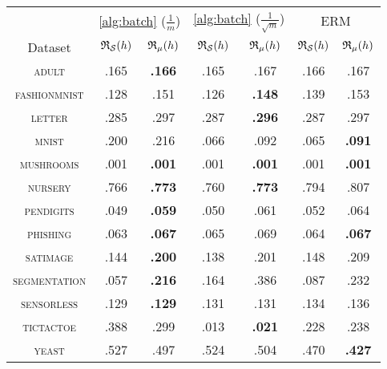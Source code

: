 \begin{tabular}{c@{\ }|@{\ }c@{\ }c@{\ }|@{\ }c@{\ }c@{\ }|@{\ }c@{\ }c@{\ }||}
\toprule
 & \multicolumn{2}{c}{\cref{alg:batch} {\small ($\frac{1}{m}$)}} & \multicolumn{2}{c}{\cref{alg:batch} {\small ($\frac{1}{\sqrt{m}}$)}} & \multicolumn{2}{c}{ERM} \\
Dataset & {\scriptsize $\mathfrak{R}_{\mathcal{S}}(h)$} & {\scriptsize $\mathfrak{R}_{\mu}(h)$} & {\scriptsize $\mathfrak{R}_{\mathcal{S}}(h)$} & {\scriptsize $\mathfrak{R}_{\mu}(h)$} & {\scriptsize $\mathfrak{R}_{\mathcal{S}}(h)$} & {\scriptsize $\mathfrak{R}_{\mu}(h)$} \\
\midrule
\textsc{\footnotesize adult} & .165 & {\bf .166} & .165 & .167 & .166 & .167 \\
\textsc{\footnotesize fashionmnist} & .128 & .151 & .126 & {\bf .148} & .139 & .153 \\
\textsc{\footnotesize letter} & .285 & .297 & .287 & {\bf .296} & .287 & .297 \\
\textsc{\footnotesize mnist} & .200 & .216 & .066 & .092 & .065 & {\bf .091} \\
\textsc{\footnotesize mushrooms} & .001 & {\bf .001} & .001 & {\bf .001} & .001 & {\bf .001} \\
\textsc{\footnotesize nursery} & .766 & {\bf .773} & .760 & {\bf .773} & .794 & .807 \\
\textsc{\footnotesize pendigits} & .049 & {\bf .059} & .050 & .061 & .052 & .064 \\
\textsc{\footnotesize phishing} & .063 & {\bf .067} & .065 & .069 & .064 & {\bf .067} \\
\textsc{\footnotesize satimage} & .144 & {\bf .200} & .138 & .201 & .148 & .209 \\
\textsc{\footnotesize segmentation} & .057 & {\bf .216} & .164 & .386 & .087 & .232 \\
\textsc{\footnotesize sensorless} & .129 & {\bf .129} & .131 & .131 & .134 & .136 \\
\textsc{\footnotesize tictactoe} & .388 & .299 & .013 & {\bf .021} & .228 & .238 \\
\textsc{\footnotesize yeast} & .527 & .497 & .524 & .504 & .470 & {\bf .427} \\
\bottomrule
\end{tabular}
